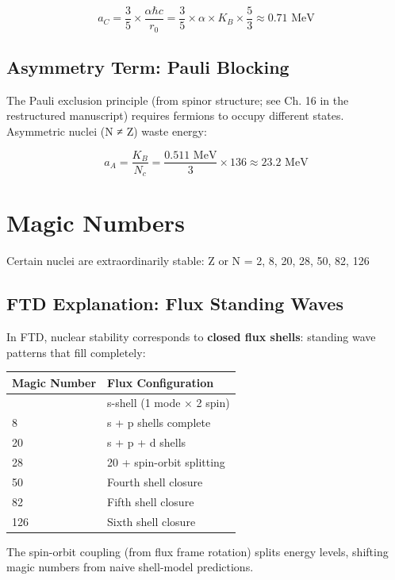 \documentclass[
  11pt,
  letterpaper,
  twoside,
  openright]{book}
\begin{document}
\[a_C = \frac{3}{5} \times \frac{\alpha \hbar c}{r_0} = \frac{3}{5} \times \alpha \times K_B \times \frac{5}{3} \approx 0.71 \text{ MeV}\]

\subsection{Asymmetry Term: Pauli
Blocking}\label{asymmetry-term-pauli-blocking}

The Pauli exclusion principle (from spinor structure; see Ch. 16 in the
restructured manuscript) requires fermions to occupy different states.
Asymmetric nuclei (N ≠ Z) waste energy:

\[a_A = \frac{K_B}{N_c} = \frac{0.511 \text{ MeV}}{3} \times 136 \approx 23.2 \text{ MeV}\]

\section{Magic Numbers}\label{magic-numbers}

Certain nuclei are extraordinarily stable: Z or N = 2, 8, 20, 28, 50,
82, 126

\subsection{FTD Explanation: Flux Standing
Waves}\label{ftd-explanation-flux-standing-waves}

In FTD, nuclear stability corresponds to \textbf{closed flux shells}:
standing wave patterns that fill completely:

\begin{longtable}[]{@{}ll@{}}
\toprule\noalign{}
Magic Number & Flux Configuration \\
\midrule\noalign{}
\endhead
\bottomrule\noalign{}
\endlastfoot
2 & s-shell (1 mode × 2 spin) \\
8 & s + p shells complete \\
20 & s + p + d shells \\
28 & 20 + spin-orbit splitting \\
50 & Fourth shell closure \\
82 & Fifth shell closure \\
126 & Sixth shell closure \\
\end{longtable}

The spin-orbit coupling (from flux frame rotation) splits energy levels,
shifting magic numbers from naive shell-model predictions.
\end{document}
